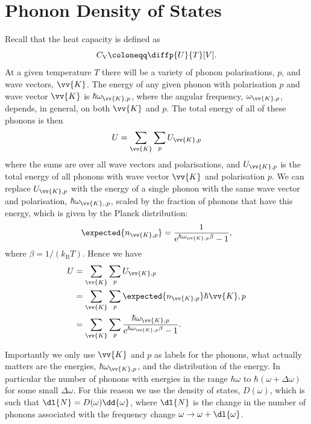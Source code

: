 \documentclass[fleqn]{NotesClass}
\newcommand*{\boltzmann}{k_{\mathrm{B}}}
\newcommand*{\e}{\mathrm{e}}
\newcommand*{\heatCapacityVolume}{C_{\mathrm{V}}}
\begin{document}
    \section{Phonon Density of States}
    Recall that the heat capacity is defined as
    \begin{equation}
        \heatCapacityVolume \coloneqq \diffp{U}{T}[V].
    \end{equation}
    At a given temperature \(T\) there will be a variety of phonon polarisations, \(p\), and wave vectors, \(\vv{K}\).
    The energy of any given phonon with polarisation \(p\) and wave vector \(\vv{K}\) is \(\hbar\omega_{\vv{K}, p}\), where the angular frequency, \(\omega_{\vv{K}, p}\), depends, in general, on both \(\vv{K}\) and \(p\).
    The total energy of all of these phonons is then
    \begin{equation}
        U = \sum_{\vv{K}}\sum_{p} U_{\vv{K}, p}
    \end{equation}
    where the sums are over all wave vectors and polarisations, and \(U_{\vv{K}, p}\) is the total energy of all phonons with wave vector \(\vv{K}\) and polarisation \(p\).
    We can replace \(U_{\vv{K}, p}\) with the energy of a single phonon with the same wave vector and polarisation, \(\hbar\omega_{\vv{K},, p}\), scaled by the fraction of phonons that have this energy, which is given by the Planck distribution:
    \begin{equation}
        \expected{n_{\vv{K}, p}} = \frac{1}{\e^{\hbar\omega_{\vv{K}, p}\beta} - 1},
    \end{equation}
    where \(\beta = 1/(\boltzmann T)\).
    Hence we have
    \begin{align}
        U &= \sum_{\vv{K}} \sum_{p} U_{\vv{K}, p}\\
        &= \sum_{\vv{K}} \sum_{p} \expected{n_{\vv{K}, p}} \hbar{\vv{K}, p}\\
        &= \sum_{\vv{K}} \sum_{p} \frac{\hbar\omega_{\vv{K}, p}}{\e^{\hbar\omega_{\vv{K}, p}\beta} - 1}.\label{eqn:phonon energy}
    \end{align}
    
    Importantly we only use \(\vv{K}\) and \(p\) as labels for the phonons, what actually matters are the energies, \(\hbar\omega_{\vv{K}, p}\), and the distribution of the energy.
    In particular the number of phonons with energies in the range \(\hbar\omega\) to \(\hbar(\omega + \Delta\omega)\) for some small \(\Delta\omega\).
    For this reason we use the density of states, \(D(\omega)\), which is such that \(\dl{N} = D(\omega) \dd{\omega}\), where \(\dl{N}\) is the change in the number of phonons associated with the frequency change \(\omega \to \omega + \dl{\omega}\).
    
\end{document}
